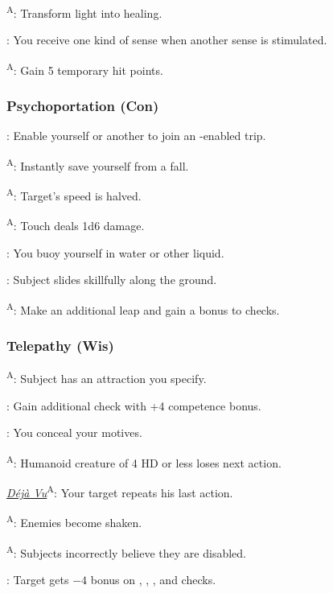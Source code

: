 \textsuperscript{A}: Transform light into healing.

: You receive one kind of sense when another sense is stimulated.

\textsuperscript{A}: Gain 5 temporary hit points.


\subsubsection{Psychoportation (Con)}

: Enable yourself or another to join an -enabled trip.

\textsuperscript{A}: Instantly save yourself from a fall.

\textsuperscript{A}: Target's speed is halved.

\textsuperscript{A}: Touch deals 1d6 damage.

: You buoy yourself in water or other liquid.

: Subject slides skillfully along the ground.

\textsuperscript{A}: Make an additional leap and gain a bonus to  checks.


\subsubsection{Telepathy (Wis)}

\textsuperscript{A}: Subject has an attraction you specify.

: Gain additional  check with +4 competence bonus.

: You conceal your motives.

\textsuperscript{A}: Humanoid creature of 4 HD or less loses next action.

\noindent\textit{\hyperref[psionic:Deja Vu]{Déjà Vu}}\textsuperscript{A}: Your target repeats his last action.

\textsuperscript{A}: Enemies become shaken.

\textsuperscript{A}: Subjects incorrectly believe they are disabled.

: Target gets $-4$ bonus on , , , and  checks.

